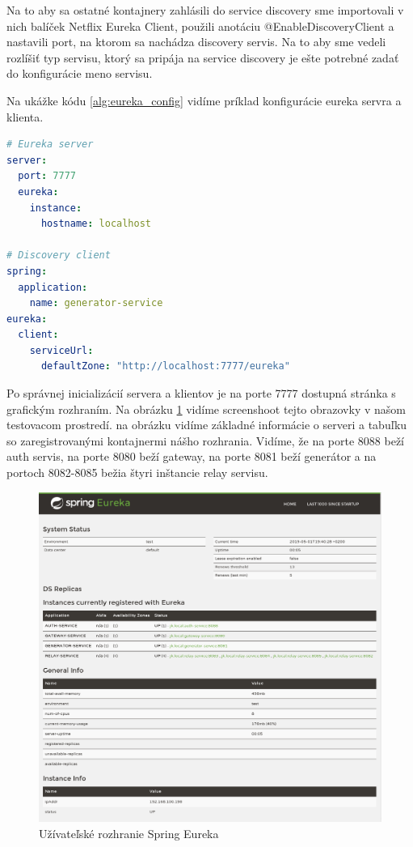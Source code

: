 Na to aby sa ostatné kontajnery zahlásili do service discovery sme importovali v nich balíček Netflix Eureka Client, použili anotáciu @EnableDiscoveryClient a nastavili port, na ktorom sa nachádza discovery servis. Na to aby sme vedeli rozlíšiť typ servisu, ktorý sa pripája na service discovery je ešte potrebné zadať do konfigurácie meno servisu.  

Na ukážke kódu \ref{alg:eureka_config} vidíme príklad konfigurácie eureka servra a klienta. 


\begin{lstlisting}[float, caption={Konfigurácia Eureka servra a klienta},label={alg:eureka_config},language=yaml]
# Eureka server
server:
  port: 7777
  eureka:
	instance:
	  hostname: localhost
			
# Discovery client	
spring:
  application:
	name: generator-service
eureka:
  client:
	serviceUrl:
	  defaultZone: "http://localhost:7777/eureka"
\end{lstlisting} 


Po správnej inicializácií servera a klientov je na porte 7777 dostupná stránka s grafickým rozhraním. Na obrázku \ref{eureka_gui} vidíme screenshoot tejto obrazovky v našom testovacom prostredí. na obrázku vidíme základné informácie o serveri a tabuľku so zaregistrovanými kontajnermi nášho rozhrania. Vidíme, že na porte 8088 beží auth servis, na porte 8080 beží gateway, na porte 8081 beží generátor a na portoch 8082-8085 bežia štyri inštancie relay servisu. 

\begin{figure}[!htbp] 
	\centering 
	\includegraphics[width=16cm]{img/eureka_gui.png} 
	\caption{Užívateľské rozhranie Spring Eureka} 
	\label{eureka_gui} 
\end{figure}


